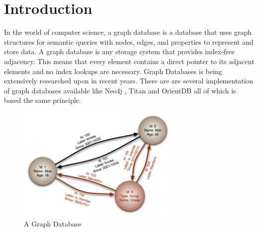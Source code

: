 \documentclass[12pt, oneside]{book}
\begin{document}
\chapter{Introduction}
In the world of computer science, a graph database is a database that uses graph structures for semantic queries with nodes, edges, and properties to represent and store data. A graph database is any storage system that provides index-free adjacency. This means that every element contains a direct pointer to its adjacent elements and no index lookups are necessary. Graph Databases is being extensively researched upon in recent years. There are are several implementation of graph databases available like Neo4j \cite{neo4j}, Titan \cite{titan} and OrientDB \cite{orientdb} all of which is based the same principle.
\begin{figure}[h]
 \begin{center}
  \includegraphics[width=0.7\textwidth]{pics/graph.png}
  \caption{A Graph Database}
 \end{center}
\end{figure}
\end{document}
